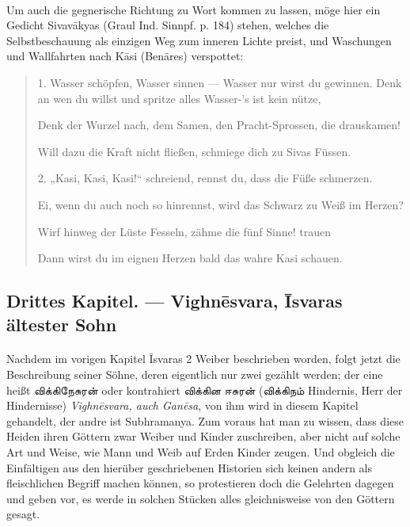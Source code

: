 \documentclass{article}
\newcommand{\TamilText}[1]{\texttamil{#1}}
\newcommand{\tam}[1]{\TamilText{#1}}
\begin{document}
\begin{center}
\end{center}
\paragraph{}
Um auch die gegnerische Richtung zu Wort kommen zu lassen, möge hier ein Gedicht Sivav\={a}kyas (Graul Ind. Sinnpf. p. 184) stehen, welches die Selbstbeschauung als einzigen Weg zum inneren Lichte preist, und Waschungen und Wallfahrten nach K\={a}si (Ben\={a}res) verspottet:
\begin{quotation}\small
1. Wasser schöpfen, Wasser sinnen — Wasser nur wirst du gewinnen. Denk an wen du willst und spritze alles Wasser-'s ist kein nütze,

Denk der Wurzel nach, dem Samen, den Pracht-Sprossen, die drauskamen!

Will dazu die Kraft nicht fließen, schmiege dich zu Sivas Füssen.

\bigskip

2. „Kasi, Kasi, Kasi!“ schreiend, rennst du, dass die Füße schmerzen.

Ei, wenn du auch noch so hinrennst, wird das Schwarz zu Weiß im Herzen?

Wirf hinweg der Lüste Fesseln, zähme die fünf Sinne! trauen

Dann wirst du im eignen Herzen bald das wahre Kasi schauen.
\end{quotation}
\clearpage
\subsection{Drittes Kapitel. — Vighn\={e}svara, \={I}svaras ältester Sohn}
\paragraph{}
Nachdem im vorigen Kapitel \={I}svaras 2 Weiber beschrieben worden, folgt jetzt die Beschreibung seiner Söhne, deren eigentlich nur zwei gezählt werden; der eine heißt \tam{விக்கிநேசுரன்} oder kontrahiert \tam{விக்கின} \tam{ஈசுரன்} (\tam{விக்கிநம்} Hindernis, Herr der Hindernisse) \emph{Vighn\={e}svara, auch Gan\={e}sa}, von ihm wird in diesem Kapitel gehandelt, der andre ist Subhramanya. Zum voraus hat man zu wissen, dass diese Heiden ihren Göttern zwar Weiber und Kinder zuschreiben, aber nicht auf solche Art und Weise, wie Mann und Weib auf Erden Kinder zeugen. Und obgleich die Einfältigen aus den hierüber geschriebenen Historien sich keinen andern als fleischlichen Begriff machen können, so protestieren doch die Gelehrten dagegen und geben vor, es werde in solchen Stücken alles gleichnisweise von den Göttern gesagt.
\end{document}

